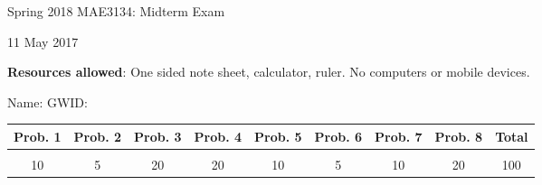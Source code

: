 \documentclass[titlepage, 11pt, reqno]{article}    %
\begin{document}
\begin{titlepage}
    \centering
    \vspace{1cm}
    {\Large Spring 2018 MAE3134: Midterm Exam\par }
    \vspace{3cm}
    {11 May 2017\par}
    \vspace{1cm}
    \textbf{Resources allowed}: One sided note sheet, calculator, ruler. 
    No computers or mobile devices.

    \vspace{1cm}
    {Name: \underline{\hspace{5cm}} \hspace{2cm} GWID:\underline{\hspace{5cm}}\par}
    \vspace{3cm}

    \begin{tabular}{|c|c|c|c|c|c|c|c|c|}
        \hline
        Prob. 1 & Prob. 2 & Prob. 3 & Prob. 4 & Prob. 5 & Prob. 6 & Prob. 7 & Prob. 8 & Total \\
        \hline
         & & & & & & & &\\[4ex]
        \hline
        10 & 5 & 20 & 20 & 10 & 5 & 10 & 20 & 100 \\[4ex]
        \hline
    \end{tabular}
    \vfill
\end{titlepage}
\end{document}
